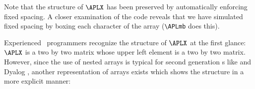 Note that the structure of $\APLX$ has been preserved by
automatically enforcing fixed
spacing. A closer examination of the code reveals that we have simulated
fixed spacing by boxing each character of the array
(\verb+\APLmb+ does this).
 
Experienced \APL\ programmers recognize the structure of $\APLX$
at the first glance: $\APLX$ is a two by two matrix whose upper
left element is a two by two matrix. However,
since the use of nested arrays is typical for second generation
\APL s like  and Dyalog \APL, another representation
of arrays exists which shows the structure in a more explicit manner:
 
%
 
{\it
\begin{APLarray}
\APLmb{\APLdot}\APLmb{\APLrightarrow}\APLmb{\APLbar}\APLmb{
\APLbar}\APLmb{\APLbar}\APLmb{\APLbar}\APLmb{\APLbar}\APLmb{
\APLbar}\APLmb{\APLbar}\APLmb{\APLbar}\APLmb{\APLdot}
\APLspace\par
\APLmb{\APLdownarrow}\APLmb{\APLspace}\APLmb{\APLdot}\APLmb{
\APLrightarrow}\APLmb{\APLbar}\APLmb{\APLbar}\APLmb{\APLdot}
\APLmb{\APLspace}\APLmb{\APLspace}\APLmb{\APLspace}\APLmb{
\APLstile}
\APLspace\par
\APLmb{\APLstile}\APLmb{\APLspace}\APLmb{\APLdownarrow}
\APLmb{\APLone}\APLmb{\APLspace}\APLmb{\APLtwo}\APLmb{\APLstile}
\APLmb{\APLspace}\APLmb{\APLA}\APLmb{\APLspace}\APLmb{\APLstile}
\APLspace\par
\APLmb{\APLstile}\APLmb{\APLspace}\APLmb{\APLstile}\APLmb{
\APLthree}\APLmb{\APLspace}\APLmb{\APLfour}\APLmb{\APLstile}
\APLmb{\APLspace}\APLmb{\APLbar}\APLmb{\APLspace}\APLmb{\APLstile}
\APLspace\par
\APLmb{\APLstile}\APLmb{\APLspace}\APLmb{\APLquote}\APLmb{
\APLtilde}\APLmb{\APLbar}\APLmb{\APLbar}\APLmb{\APLquote}\APLmb{
\APLspace}\APLmb{\APLspace}\APLmb{\APLspace}\APLmb{\APLstile}
\APLspace\par
\APLmb{\APLstile}\APLmb{\APLspace}\APLmb{\APLspace}\APLmb{
\APLspace}\APLmb{\APLspace}\APLmb{\APLspace}\APLmb{\APLspace}
\APLmb{\APLspace}\APLmb{\APLspace}\APLmb{\APLspace}\APLmb{
\APLstile}
\APLspace\par
\APLmb{\APLstile}\APLmb{\APLspace}\APLmb{\APLspace}\APLmb{
\APLB}\APLmb{\APLspace}\APLmb{\APLspace}\APLmb{\APLspace}\APLmb{
\APLspace}\APLmb{\APLC}\APLmb{\APLspace}\APLmb{\APLstile}
\APLspace\par
\APLmb{\APLstile}\APLmb{\APLspace}\APLmb{\APLspace}\APLmb{
\APLbar}\APLmb{\APLspace}\APLmb{\APLspace}\APLmb{\APLspace}
\APLmb{\APLspace}\APLmb{\APLbar}\APLmb{\APLspace}\APLmb{\APLstile}
\APLspace\par
\APLmb{\APLquote}\APLmb{\APLepsilon}\APLmb{\APLbar}\APLmb{
\APLbar}\APLmb{\APLbar}\APLmb{\APLbar}\APLmb{\APLbar}\APLmb{
\APLbar}\APLmb{\APLbar}\APLmb{\APLbar}\APLmb{\APLquote}
\APLspace\par
\end{APLarray}
}
 
